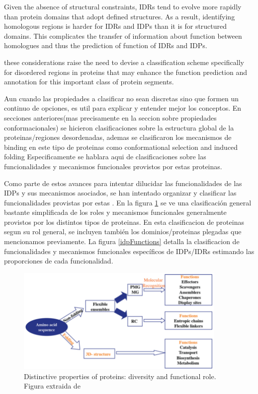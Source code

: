 Given the absence of structural constraints, IDRs tend to evolve more rapidly than protein domains that adopt defined structures. 
As a result, identifying homologous regions is harder for IDRs and IDPs than it is for structured domains.
This complicates the transfer of information about function between homologues and thus the prediction of function of IDRs and IDPs.

these considerations raise the need to devise a classification scheme specifically for disordered regions in proteins that may enhance
the function prediction and annotation for this important class of protein segments.

Aun cuando las propiedades a clasificar no sean discretas sino que formen un continuo de opciones, es util para explicar y entender mejor los conceptos.
En secciones anteriores(mas precisamente en la seccion sobre propiedades conformacionales) se hicieron clasificaciones sobre la estructura global de la proteinas/regiones desordenadas, 
ademas se clasificaron los mecanismos de binding en este tipo de proteinas como conformational selection and induced folding
Especificamente se hablara aqui de clasificaciones sobre las funcionalidades y mecanismos funcionales provistos por estas proteinas.

Como parte de estos avances para intentar dilucidar las funcionalidades de las IDPs y sus mecanismos asociados, se han intentado organizar y clasificar las funcionalidades provistas por estas \cite{van2014classification}.
En la figura \ref{proteinMechanisms} se ve una clasificación general bastante simplificada de los roles y mecanismos funcionales generalmente provistos por los distintos tipos de proteinas. 
En esta clasificacion de proteinas segun su rol general, se incluyen también los dominios/proteinas plegadas que mencionamos previamente.
La figura \ref{idpFunctions} detalla la clasificacion de funcionalidades y mecanismos funcionales específicos de IDPs/IDRs estimando las proporciones de cada funcionalidad.

\begin{figure}[h!,centered]
\centering
\includegraphics[width=0.9\textwidth]{img/proteinFunctionMechanisms.png} 
\caption{Distinctive properties of proteins: diversity and functional role. Figura extraida de \cite{habchi2014introducing} }
\label{proteinMechanisms}
\end{figure}





